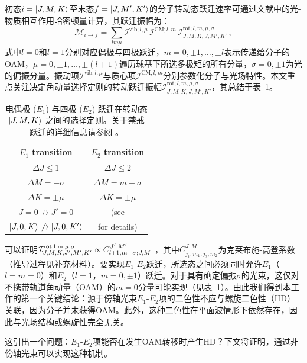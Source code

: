 \documentclass[reprint,aps,prl,twocolumn,superscriptaddress,groupedaddress]{revtex4-2}
\newcommand{\eoet}{$E_1$-$E_2$}
\begin{document}
初态$i=\ket{J,M,K}$至末态$f=\ket{J,M',K'}$的分子转动态跃迁速率可通过文献\cite{Maslov2024,Maslov_Thesis}中的光-物质相互作用哈密顿量计算，其跃迁振幅为：
\begin{equation}
    \mathcal{M}_{i\to f}=\sum_{lm\mu}\mathcal{I}^{\text{vib}; l,\mu}\,\mathcal{I}^{\text{CM}; l,m}\,\mathcal{I}^{\text{rot}; l,m,\mu,\sigma}_{J,M,K,J,M',K'}\,,
    \label{eq_transition_matrix}
\end{equation}
式中$l=0$和$l=1$分别对应偶极与四极跃迁，$m = 0, \pm 1, \dots, \pm l$表示传递给分子的OAM，$\mu = 0, \pm 1, \dots, \pm (l+1)$遍历球基下所选多极矩的所有分量，$\sigma =0, \pm 1$为光的偏振分量。振动项$\mathcal{I}^{\text{vib}; l,\mu}$与质心项$\mathcal{I}^{\text{CM}; l,m}$分别参数化分子与光场特性。本文重点关注决定角动量选择定则的转动跃迁振幅$\mathcal{I}^{\text{rot};l,m,\mu,\sigma}_{J,M,K,J,M',K'}$，其总结于表~\ref{SelectionRules}。
\begin{table}[ht!]
    \centering
    \begin{tabular}{c c}\hline
    \toprule
        \textbf{$E_1$ transition} & \textbf{$E_2$ transition}  \\
        \midrule
        $\Delta J\leq 1$ &  $\Delta J\leq 2$ \\
        $\Delta M=-\sigma$ & $\Delta M=m-\sigma$ \\
        $\Delta K=\pm\mu$ & $\Delta K=\pm\mu$ \\
        $J=0\not\to J'=0$ &  (see \cite{Note1}\\
        $\ket{J,0,K}\not\to\ket{J,0,K'}$ &  for details)\\
    \bottomrule
\hline
    \end{tabular}
    \caption{电偶极 ($E_1$) 与四极 ($E_2$) 跃迁在转动态 $\ket{J,M,K}$ 之间的选择定则。关于禁戒跃迁的详细信息请参阅 \cite{Note1}。}
    \label{SelectionRules}
\end{table}
可以证明$\mathcal{I}^{\rm rot; l, m, \mu, \sigma}_{J, M, K, J', M', K'} \propto C^{J',M'}_{l+1, m-\sigma; J, M}$ \cite{Maslov2024,Maslov_Thesis}，其中$C^{J, M}_{j_1, m_1, j_2, m_2}$为克莱布施-高登系数（推导过程见补充材料\cite{Note1}）。要实现\eoet 跃迁，所选态之间必须同时允许$E_1$（$l=m=0$）和$E_2$（$l = 1$，$m = 0, \pm 1$）跃迁。对于具有确定偏振$\sigma$的光束，这仅对不携带轨道角动量（OAM）的$m = 0$分量可能实现（见表~\ref{SelectionRules}）。由此我们得到本工作的第一个关键结论：源于傍轴光束\eoet 项的二色性不应与螺旋二色性（HD）关联，因为分子并未获得OAM。此外，这种二色性在平面波情形下依然存在，因此与光场结构或螺旋性完全无关。

这引出一个问题：\eoet 项能否在发生OAM转移时产生HD？下文将证明，通过非傍轴光束可以实现这种机制。
\end{document}

